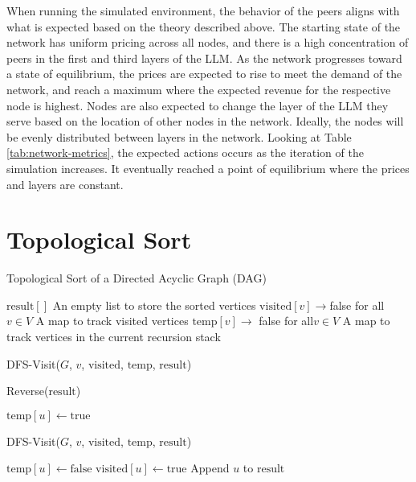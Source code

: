 \documentclass[preprint,twoside,11pt]{article}
\begin{document}
When running the simulated environment, the behavior of the peers aligns with what is expected based on the theory described above.
The starting state of the network has uniform pricing across all nodes, and there is a high concentration of peers in the first and third layers of the LLM.
As the network progresses toward a state of equilibrium, the prices are expected to rise to meet the demand of the network, and reach a maximum where the expected revenue for the respective node is highest.
Nodes are also expected to change the layer of the LLM they serve based on the location of other nodes in the network. Ideally, the nodes will be evenly distributed between layers in the network.
Looking at Table \ref{tab:network-metrics}, the expected actions occurs as the iteration of the simulation increases.
It eventually reached a point of equilibrium where the prices and layers are constant.

%
\newpage

\appendix
\section{Topological Sort}
\label{app:topo_sort}
\begin{algorithm}
	\caption{Topological Sort of a Directed Acyclic Graph (DAG)}
	\begin{algorithmic}[1]

		\State $\text{result}[]$ \Comment An empty list to store the sorted vertices
		\State $\text{visited}[v] \rightarrow $false for all $v \in V$ \Comment A map to track visited vertices
		\State $\text{temp}[v] \rightarrow $ false for all$ v \in V$ \Comment A map to track vertices in the current recursion stack

		\State DFS-Visit($G$, $v$, $\text{visited}$, $\text{temp}$, $\text{result}$)
		\EndIf
		\EndFor

		\State \Return Reverse($\text{result}$)

		\State $\text{temp}[u] \gets \text{true}$ 

		\State DFS-Visit($G$, $v$, $\text{visited}$, $\text{temp}$, $\text{result}$)
		\EndFor

		\State $\text{temp}[u] \gets \text{false}$ 
		\State $\text{visited}[u] \gets \text{true}$ 
		\State Append $u$ to $\text{result}$
		\EndFunction
	\end{algorithmic}
\end{algorithm}
\end{document}
